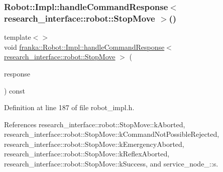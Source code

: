 \mbox{\label{namespacefranka_a09b33e685728ad5f233cf81ca0e0a8c2}} 
\subsubsection{\texorpdfstring{Robot\+::\+Impl\+::handle\+Command\+Response$<$ research\+\_\+interface\+::robot\+::\+Stop\+Move $>$()}{Robot::Impl::handleCommandResponse< research\_interface::robot::StopMove >()}}
{\footnotesize\ttfamily template$<$$>$ \\
void \hyperlink{classfranka_1_1Robot_1_1Impl_ac281e9292f59718758b2c9897b004776}{franka\+::\+Robot\+::\+Impl\+::handle\+Command\+Response}$<$ \hyperlink{structresearch__interface_1_1robot_1_1StopMove}{research\+\_\+interface\+::robot\+::\+Stop\+Move} $>$ (\begin{DoxyParamCaption}\item[{const \hyperlink{structresearch__interface_1_1robot_1_1CommandBase_ae8b503e2bc7d72e70b6eb08421e0d853}{research\+\_\+interface\+::robot\+::\+Stop\+Move\+::\+Response} \&}]{response }\end{DoxyParamCaption}) const\hspace{0.3cm}{\ttfamily [inline]}}



Definition at line 187 of file robot\+\_\+impl.\+h.



References research\+\_\+interface\+::robot\+::\+Stop\+Move\+::k\+Aborted, research\+\_\+interface\+::robot\+::\+Stop\+Move\+::k\+Command\+Not\+Possible\+Rejected, research\+\_\+interface\+::robot\+::\+Stop\+Move\+::k\+Emergency\+Aborted, research\+\_\+interface\+::robot\+::\+Stop\+Move\+::k\+Reflex\+Aborted, research\+\_\+interface\+::robot\+::\+Stop\+Move\+::k\+Success, and service\+\_\+node\+\_\+::s.


